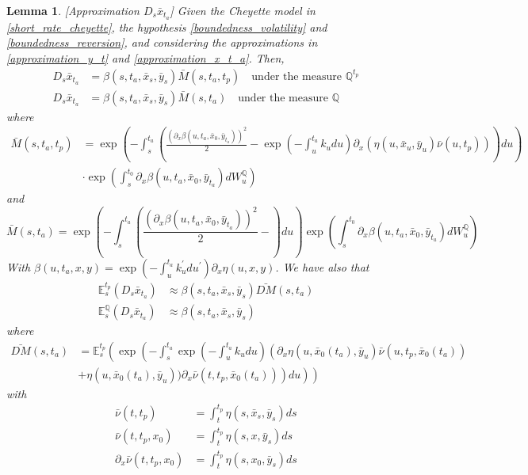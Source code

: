 \documentclass[a4paper,10pt]{article}
\newtheorem{lemma}[theorem]{Lemma}
\newcommand{\1}{\mathbf{1}}
\begin{document}
\begin{lemma}\label{DsX}[Approximation $D_s \bar{x}_{t_a}$]
Given the Cheyette model in \eqref{short_rate_cheyette}, the hypothesis \ref{boundedness_volatility} and \ref{boundedness_reversion}, and considering the approximations in \eqref{approximation_y_t} and \eqref{approximation_x_t_a}. Then, 
\begin{align}\label{approximation_D_s_x_t}
D_s \bar{x}_{t_a} &= \beta(s,t_a,\bar{x}_s,\bar{y}_s) \bar{M}(s,t_a,t_p) \quad \text{under the measure $\mathbb{Q}^{t_p}$} \nonumber \\
D_s \bar{x}_{t_a} &= \beta(s,t_a,\bar{x}_s,\bar{y}_s) \bar{M}(s,t_a)  \quad \text{under the measure $\mathbb{Q}$}
\end{align}
where
\begin{align*}
\bar{M}(s,t_a,t_p) &= \exp\left(-\int_{s}^{t_a} \left( \frac{\left(\partial_x \beta(u,t_a,\bar{x}_0,\bar{y}_{t_a})\right)^{2}}{2} - \exp\left(-\int_{u}^{t_a}k_u du\right) \partial_x (\eta(u, \bar{x}_u, \bar{y}_{u}) \bar{\nu}(u,t_p))\right) du \right) \\ 
&\cdot\exp\left(\int_{s}^{t_0} \partial_x \beta(u,t_a,\bar{x}_0,\bar{y}_{t_a}) dW^{\mathbb{Q}}_u \right)
\end{align*}
and
\begin{equation*}
\bar{M}(s,t_a) = \exp\left(-\int_{s}^{t_a} \left( \frac{\left(\partial_x \beta(u,t_a,\bar{x}_0,\bar{y}_{t_a})\right)^{2}}{2} - \right) du \right) \exp\left(\int_{s}^{t_0} \partial_x \beta(u,t_a,\bar{x}_0,\bar{y}_{t_a}) dW^{\mathbb{Q}}_u \right)
\end{equation*} 
With $\beta(u,t_a,x,y) = \exp\left(-\int_{u}^{t_a}k_u^{\prime} du^{\prime}\right) \partial_x \eta(u,x,y)$. We have also that
\begin{align}\label{approsimation_E_s_x_t}
\mathbb{E}_s^{t_p}\left(D_s \bar{x}_{t_a}\right) &\approx \beta(s,t_a,\bar{x}_s,\bar{y}_s) \bar{DM}(s,t_a) \nonumber \\
\mathbb{E}_s^{\mathbb{Q}}\left(D_s \bar{x}_{t_a}\right)&\approx \beta(s,t_a,\bar{x}_s,\bar{y}_s)
\end{align}
where 
\begin{align*}
\bar{DM}(s,t_a) &= \mathbb{E}^{t_p}_s\left(\exp\left(-\int_{s}^{t_a} \exp\left(-\int_{u}^{t_a}k_u du\right)\left(\partial_x \eta(u, \bar{x}_0(t_a), \bar{y}_{u}) \bar{\nu}(u,t_p, \bar{x}_0(t_a)) \right. \right. \right. \\
&+ \left. \left. \left. \eta(u,\bar{x}_0(t_a), \bar{y}_{u})) \partial_x \bar{\nu}(t,t_p, \bar{x}_0(t_a)) \right)  du \right)\right) 
\end{align*}
with  
\begin{align*}
\bar{\nu}(t,t_p) &= \int_{t}^{t_p} \eta(s,\bar{x}_s,\bar{y}_s) ds \\
\bar{\nu}(t,t_p, x_0) &= \int_{t}^{t_p} \eta(s,x,\bar{y}_s) ds \\
\partial_x \bar{\nu}(t,t_p,x_0) &= \int_{t}^{t_p} \eta(s,x_0,\bar{y}_s) ds\\
\end{align*}
\end{lemma}
\end{document}
